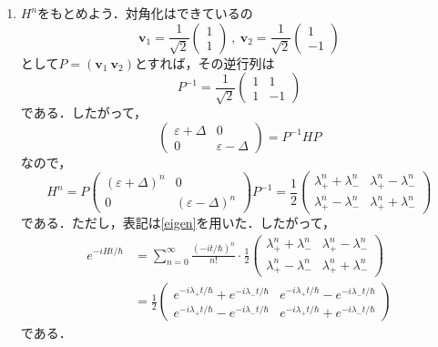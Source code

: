 \documentclass[a4paper,pdflatex,ja=standard]{bxjsarticle}
\begin{document}
\begin{enumerate}
  \item 
  $H^{n}$をもとめよう．対角化はできているの
  \begin{equation}
    \bm{v}_{1}
    =
    \frac{1}{\sqrt{2}}\begin{pmatrix}
      1 \\
      1
    \end{pmatrix}
    \ ,\ \bm{v}_{2}
    =
    \frac{1}{\sqrt{2}}\begin{pmatrix}
      1 \\
      -1
    \end{pmatrix}
  \end{equation}
  として$P=(\bm{v}_{1}\ \bm{v}_{2})$とすれば，その逆行列は
  \begin{equation}
    P^{-1}
    =
    \frac{1}{\sqrt{2}}
    \begin{pmatrix}
      1 & 1 \\
      1 & -1
    \end{pmatrix}
  \end{equation}
  である．したがって，
  \begin{equation}
    \begin{pmatrix}
      \varepsilon+\Delta & 0 \\
      0 & \varepsilon-\Delta
    \end{pmatrix}
    =
    P^{-1}
    H
    P
  \end{equation}
  なので，
  \begin{equation}
    H^{n}
    =
    P
    \begin{pmatrix}
      (\varepsilon+\Delta)^{n} & 0 \\
      0 & (\varepsilon-\Delta)^{n}
    \end{pmatrix}
    P^{-1}
    =
    \frac{1}{2}
    \begin{pmatrix}
      \lambda_{+}^{n}+\lambda_{-}^{n}
      &
      \lambda_{+}^{n}-\lambda_{-}^{n}
      \\
      \lambda_{+}^{n}-\lambda_{-}^{n}
      &
      \lambda_{+}^{n}+\lambda_{-}^{n}
    \end{pmatrix}
  \end{equation}
  である．ただし，表記は\eqref{eigen}を用いた．したがって，
  \begin{align}
    e^{-iHt/\hbar}
    &=
    \sum_{n=0}^{\infty}
    \frac{(-it/\hbar)^n}{n!}
    \cdot
    \frac{1}{2}
    \begin{pmatrix}
      \lambda_{+}^{n}+\lambda_{-}^{n}
      &
      \lambda_{+}^{n}-\lambda_{-}^{n}
      \\
      \lambda_{+}^{n}-\lambda_{-}^{n}
      &
      \lambda_{+}^{n}+\lambda_{-}^{n}
    \end{pmatrix}
    \nonumber
    \\
    &=
    \frac{1}{2}
    \begin{pmatrix}
      e^{-i\lambda_{+}t/\hbar}+e^{-i\lambda_{-}t/\hbar}
      &
      e^{-i\lambda_{+}t/\hbar}-e^{-i\lambda_{-}t/\hbar}
      \\
      e^{-i\lambda_{+}t/\hbar}-e^{-i\lambda_{-}t/\hbar}
      &
      e^{-i\lambda_{+}t/\hbar}+e^{-i\lambda_{-}t/\hbar}
    \end{pmatrix}
  \end{align}
  である．


\end{enumerate}
\end{document}
